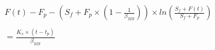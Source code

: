 \begin{equation}
\label{MSeytoux}
\begin{array}{l}
F(t) - F_p - \left(S_f + F_p \times \left(1 - \frac{1}{\beta_{MS}} \right) \right) \times ln \left(\frac{S_f + F(t)}{S_f+F_p} \right)\\
\\
 = \frac{K_s \times (t - t_p)}{\beta_{MS}}
\end{array}
\end{equation}
